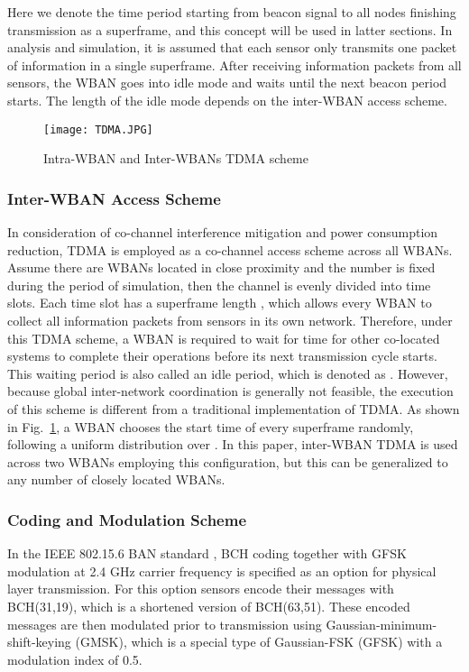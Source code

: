 \documentclass[12pt,draftcls,a4paper,onecolumn,journal]{IEEEtran}
\begin{document}
Here we denote the time period starting from beacon signal to all nodes finishing transmission as a superframe, and this concept will be used in latter sections. In analysis and simulation, it is assumed that each sensor only transmits one packet of information in a single superframe. After receiving information packets from all sensors, the WBAN goes into idle mode and waits until the next beacon period starts. The length of the idle mode depends on the inter-WBAN access scheme.

\begin{figure}
\centering
\texttt{[image: TDMA.JPG]}
\caption{Intra-WBAN and Inter-WBANs TDMA scheme}
\label{fig: TDMA}
\end{figure}

\subsubsection{Inter-WBAN Access Scheme}
In consideration of co-channel interference mitigation and power consumption reduction, TDMA is employed as a co-channel access scheme across all WBANs. Assume there are  WBANs located in close proximity and the number is fixed during the period of simulation, then the channel is evenly divided into  time slots. Each time slot has a superframe length , which allows every WBAN to collect all information packets from sensors in its own network. Therefore, under this TDMA scheme, a WBAN is required to wait for time  for other co-located systems to complete their operations before its next transmission cycle starts. This waiting period is also called an idle period, which is denoted as . However, because global inter-network coordination is generally not feasible, the execution of this scheme is different from a traditional implementation of TDMA. As shown in Fig.~\ref{fig: TDMA}, a WBAN chooses the start time of every superframe randomly, following a uniform distribution over . In this paper, inter-WBAN TDMA is used across two WBANs employing this configuration, but this can be generalized to any number of closely located WBANs.

\subsubsection{Coding and Modulation Scheme}
In the IEEE 802.15.6 BAN standard \cite{tg6_d}, BCH coding together with GFSK modulation at 2.4 GHz carrier frequency is specified as an option for physical layer transmission. For this option sensors encode their messages with BCH(31,19), which is a shortened version of BCH(63,51). These encoded messages are then modulated prior to transmission using Gaussian-minimum-shift-keying (GMSK), which is a special type of Gaussian-FSK (GFSK) with a modulation index of 0.5.
\end{document}
